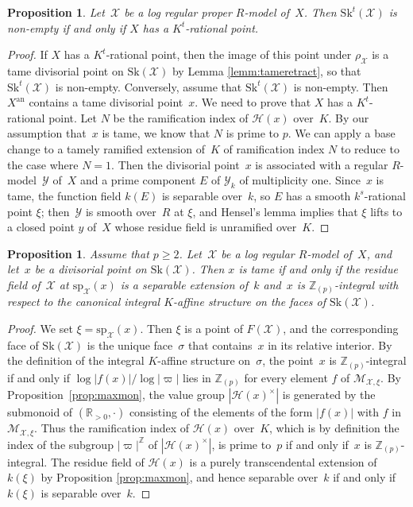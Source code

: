 \documentclass[JEP,XML,SOM,Unicode,NoFloatCountersInSection]{cedram}
\let\mathcal\mathscr
\newtheorem{prop}[equation]{Proposition}
\theoremstyle{definition}
\numberwithin{equation}{subsection}
\newcommand{\Z}{\ensuremath{\mathbb{Z}}}
\newcommand{\R}{\ensuremath{\mathbb{R}}}
\newcommand{\cX}{\ensuremath{\mathscr{X}}}
\newcommand{\cY}{\ensuremath{\mathscr{Y}}}
\newcommand{\an}{\mathrm{an}}
\newcommand{\Sk}{\mathrm{Sk}}
\newcommand{\spe}{\mathrm{sp}}
\let\unif\varpi
\begin{document}
\begin{prop}\label{prop:nonempty}
Let~$\cX$ be a log regular proper $R$\nobreakdash-model of~$X$. Then $\Sk^t(\cX)$ is non-empty if and only if $X$ has a $K^t$-rational point.
\end{prop}
\begin{proof}
If $X$ has a $K^t$-rational point, then the image of this point under $\rho_{\cX}$ is a tame divisorial point on $\Sk(\cX)$ by Lemma \ref{lemm:tameretract}, so that $\Sk^t(\cX)$ is non-empty.
Conversely, assume that $\Sk^t(\cX)$ is non-empty. Then
$X^{\an}$ contains a tame divisorial point~$x$.
We need to prove that $X$ has a $K^t$-rational point. Let $N$ be the ramification index of $\mathscr{H}(x)$ over~$K$. By our assumption that~$x$ is tame, we know that $N$ is prime to $p$. We can apply a base change to a tamely ramified extension of~$K$ of ramification index $N$ to reduce to the case where $N=1$.
Then the divisorial point~$x$ is associated with
a regular $R$\nobreakdash-model~$\cY$ of~$X$ and a prime component $E$ of $\cY_k$ of multiplicity one.
Since~$x$ is tame, the function field $k(E)$ is separable over~$k$, so $E$ has a smooth $k^s$-rational point $\xi$; then~$\cY$ is smooth over~$R$ at $\xi$, and Hensel's lemma implies that $\xi$ lifts to a closed point $y$ of~$X$ whose residue field is unramified over~$K$.
\end{proof}

\begin{prop}\label{prop:tame}
Assume that $p\geq 2$.
Let~$\cX$ be a log regular $R$\nobreakdash-model of~$X$, and let~$x$ be a divisorial point on $\Sk(\cX)$. Then
$x$ is tame if and only if the residue field of~$\cX$ at $\spe_{\cX}(x)$ is a separable extension of~$k$ and~$x$ is $\Z_{(p)}$-integral with respect to the canonical integral $K$\nobreakdash-affine structure on the faces of $\Sk(\cX)$.
\end{prop}
\begin{proof}
We set $\xi=\spe_{\cX}(x)$. Then $\xi$ is a point of $F(\cX)$, and the corresponding face of $\Sk(\cX)$ is the unique face~$\sigma$ that contains~$x$ in its relative interior. By the definition of the integral $K$\nobreakdash-affine structure on~$\sigma$, the point~$x$ is $\Z_{(p)}$-integral if and only if $\log |f(x)|/\log |\unif|$ lies in $\Z_{(p)}$ for every element $f$ of $\mathcal{M}_{\cX,\xi}$. By Proposition~\ref{prop:maxmon}, the value group $|\mathscr{H}(x)^{\times}|$ is generated by the submonoid of $(\R_{>0},\cdot)$ consisting of the elements of the form $|f(x)|$ with $f$ in $\mathcal{M}_{\cX,\xi}$.
Thus the ramification index of $\mathscr{H}(x)$ over~$K$, which is by definition the index of the subgroup $|\unif|^{\Z}$ of $|\mathscr{H}(x)^{\times}|$, is prime to~$p$ if and only if~$x$ is $\Z_{(p)}$-integral.
The residue field of $\mathscr{H}(x)$ is a purely transcendental extension of $k(\xi)$ by Proposition \ref{prop:maxmon}, and hence separable over~$k$ if and only if $k(\xi)$ is separable over~$k$.
\end{proof}
\end{document}
